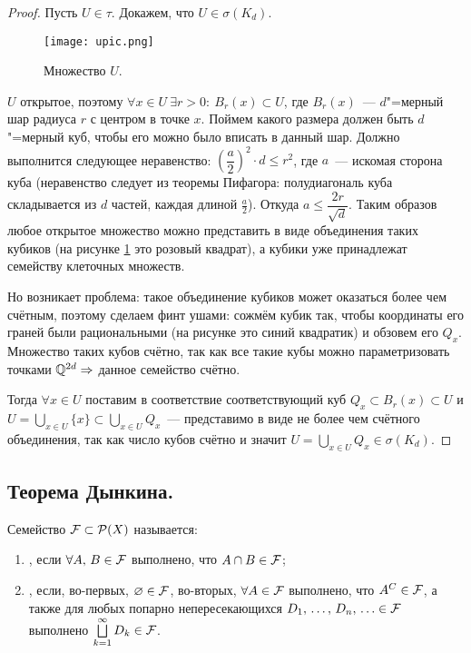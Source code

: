 \begin{claim}
\begin{proof}
        Пусть $U\in\tau$. Докажем, что $U\in\sigma(K_d)$.

        \begin{figure}[!ht]
            \centering
            \texttt{[image: upic.png]}
            \caption{Множество $U$.}
            \label{fig:upic}
        \end{figure}

        $U$ открытое, поэтому $\forall x\in U\ \exists r>0:\ B_r(x)\subset U$, где $B_r(x)$~--- 
        $d$"=мерный шар радиуса $r$ с центром в точке $x$. Поймем какого размера должен быть 
        $d$"=мерный куб, чтобы его можно было вписать в данный шар. Должно выполнится следующее 
        неравенство: $\left(\dfrac{a}{2}\right)^2\cdot d\leqslant r^2$, где $a$~--- искомая сторона
        куба (неравенство следует из теоремы Пифагора: полудиагональ куба складывается из $d$ частей, 
        каждая длиной $\frac{a}{2}$). Откуда $a\leqslant \dfrac{2r}{\sqrt{d}}$. Таким образов любое 
        открытое множество можно представить в виде объединения таких кубиков (на рисунке \ref{fig:upic} это розовый квадрат),
        а кубики уже принадлежат семейству клеточных множеств.
        
        Но возникает проблема: такое объединение кубиков может оказаться более чем счётным, поэтому сделаем финт ушами:
        сожмём кубик так, чтобы координаты его граней были рациональными (на рисунке это синий квадратик) и обзовем его $Q_x$.
        Множество таких кубов счётно, так как все такие кубы можно параметризовать точками $\mathbb{Q}^{2d}\Rightarrow$ данное семейство 
        счётно. 

        Тогда $\forall x\in U$ поставим в соответствие соответствующий куб $Q_x\subset B_r(x)\subset U$ и 
        $U=\bigcup\limits_{x\in U}\{x\}\subset \bigcup\limits_{x\in U}Q_x$~--- представимо в виде 
        не более чем счётного объединения, так как число кубов счётно и значит $U=\bigcup\limits_{x\in U}Q_x\in\sigma(K_d)$.

    \end{proof} 
\end{claim}

\subsection{Теорема Дынкина.}

\begin{definition}
    Семейство $\mathcal{F} \subset \mathcal{P}(X)$ называется:
    \begin{enumerate}[label=\arabic*)]
        \item {}, если $\forall A,\, B\in\mathcal{F} $ выполнено, что $A\cap B\in\mathcal{F} $;
        \item {}, если, во-первых, $\varnothing\in\mathcal{F} $, во-вторых,
        $\forall A\in\mathcal{F} $ выполнено, что $A^C\in\mathcal{F} $, а также для любых попарно непересекающихся 
        $D_1,\, \ldots,\, D_n,\,\ldots\in\mathcal{F} $ выполнено $\bigsqcup\limits_{k=1}^{\infty} D_k\in\mathcal{F} $.
    \end{enumerate}
\end{definition}

